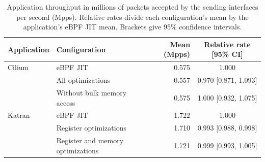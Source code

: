 \begin{table}[t]
\centering
\small
\caption{Application throughput in millions of packets accepted by the sending interfaces per second (Mpps). Relative rates divide each configuration's mean by the application's eBPF JIT mean. Brackets give 95\% confidence intervals.}
\label{tab:eval-application-throughput}
\setlength{\tabcolsep}{5pt}
\renewcommand{\arraystretch}{1.08}
\begin{tabular*}{\textwidth}{@{\extracolsep{\fill}}llrc@{}}
\toprule
\textbf{Application} & \textbf{Configuration} & \textbf{Mean (Mpps)} & \textbf{Relative rate [95\% CI]} \\
\midrule
Cilium & eBPF JIT & 0.575 & 1.000 \\
 & All optimizations & 0.557 & 0.970 [0.871, 1.093] \\
 & Without bulk memory access & 0.575 & 1.000 [0.932, 1.075] \\
\addlinespace
Katran & eBPF JIT & 1.722 & 1.000 \\
 & Register optimizations & 1.710 & 0.993 [0.988, 0.998] \\
 & Register and memory optimizations & 1.721 & 0.999 [0.993, 1.005] \\
\bottomrule
\end{tabular*}
\end{table}

